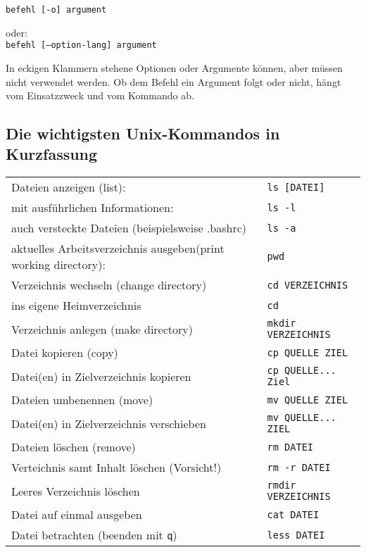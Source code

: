 \documentclass[11pt]{article}
\begin{document}
\texttt{befehl [-o] argument} 

oder:\\
\texttt{befehl [--option-lang] argument}

In eckigen Klammern stehene Optionen  oder Argumente können, aber müssen
nicht verwendet werden. Ob dem Befehl ein Argument folgt oder nicht,
hängt vom Einsatzzweck und vom Kommando ab. 

\subsection{Die wichtigsten Unix-Kommandos in Kurzfassung}
\begin{tabular}{|l|l|}
\hline
Dateien anzeigen (list): & \texttt{ls [DATEI]} \\
mit ausführlichen Informationen: & \texttt{ls -l} \\
auch versteckte Dateien (beispielsweise .bashrc) & \texttt{ls -a} \\
\hline
aktuelles Arbeitsverzeichnis ausgeben(print working directory): & \texttt{pwd} \\
\hline 
Verzeichnis wechseln (change directory) & \texttt{cd VERZEICHNIS} \\ 
ins eigene Heimverzeichnis & \texttt{cd} \\
\hline 
Verzeichnis anlegen (make directory) & \texttt{mkdir VERZEICHNIS} \\
\hline
Datei kopieren (copy) & \texttt{cp QUELLE ZIEL} \\  
Datei(en) in Zielverzeichnis kopieren & \texttt{cp QUELLE... Ziel} \\
\hline
Dateien umbenennen (move) & \texttt{mv QUELLE ZIEL} \\  
Datei(en) in Zielverzeichnis verschieben & \texttt{mv QUELLE... ZIEL} \\ 
\hline
Dateien löschen (remove) & \texttt{rm DATEI} \\
Verteichnis samt Inhalt löschen (Vorsicht!) & \texttt{rm -r DATEI} \\
\hline
Leeres Verzeichnis löschen & \texttt{rmdir VERZEICHNIS} \\
\hline  
Datei auf einmal ausgeben & \texttt{cat DATEI} \\
Datei betrachten (beenden mit \texttt{q}) & \texttt{less DATEI}  \\
\hline
\end{tabular} 
\end{document}
